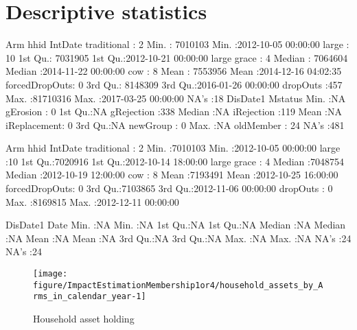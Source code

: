 \section{Descriptive statistics}



\begin{Schunk}
\begin{Soutput}
             Arm           hhid             IntDate                   
 traditional   :  2   Min.   : 7010103   Min.   :2012-10-05 00:00:00  
 large         : 10   1st Qu.: 7031905   1st Qu.:2012-10-21 00:00:00  
 large grace   :  4   Median : 7064604   Median :2014-11-22 00:00:00  
 cow           :  8   Mean   : 7553956   Mean   :2014-12-16 04:02:35  
 forcedDropOuts:  0   3rd Qu.: 8148309   3rd Qu.:2016-01-26 00:00:00  
 dropOuts      :457   Max.   :81710316   Max.   :2017-03-25 00:00:00  
                                         NA's   :18                   
    DisDate1           Mstatus   
 Min.   :NA    gErosion    :  0  
 1st Qu.:NA    gRejection  :338  
 Median :NA    iRejection  :119  
 Mean   :NA    iReplacement:  0  
 3rd Qu.:NA    newGroup    :  0  
 Max.   :NA    oldMember   : 24  
 NA's   :481                     
\end{Soutput}
\begin{Soutput}
             Arm          hhid            IntDate                   
 traditional   : 2   Min.   :7010103   Min.   :2012-10-05 00:00:00  
 large         :10   1st Qu.:7020916   1st Qu.:2012-10-14 18:00:00  
 large grace   : 4   Median :7048754   Median :2012-10-19 12:00:00  
 cow           : 8   Mean   :7193491   Mean   :2012-10-25 16:00:00  
 forcedDropOuts: 0   3rd Qu.:7103865   3rd Qu.:2012-11-06 00:00:00  
 dropOuts      : 0   Max.   :8169815   Max.   :2012-12-11 00:00:00  
                                                                    
    DisDate1       Date   
 Min.   :NA   Min.   :NA  
 1st Qu.:NA   1st Qu.:NA  
 Median :NA   Median :NA  
 Mean   :NA   Mean   :NA  
 3rd Qu.:NA   3rd Qu.:NA  
 Max.   :NA   Max.   :NA  
 NA's   :24   NA's   :24  
\end{Soutput}
\end{Schunk}
\begin{Schunk}
\begin{figure}

{\centering \texttt{[image: figure/ImpactEstimationMembership1or4/household\_assets\_by\_Arms\_in\_calendar\_year-1]} 

}

\caption[Household asset holding\\ {\footnotesize \setlength{\baselineskip}{8pt}}]{Household asset holding\\ {\footnotesize \setlength{\baselineskip}{8pt}}}\label{Figure household assets by Arms in calendar year}
\end{figure}
\end{Schunk}
